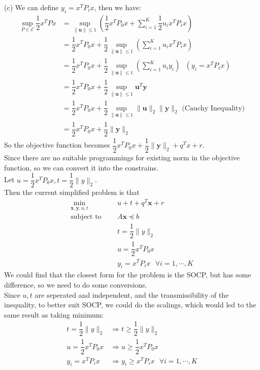 (c) We can define $y_i=x^T P_i x$, then we have:
\begin{align*}
    \sup_{P \in \mathcal{E}}\dfrac{1}{2} x^T P x &= \sup_{\|\mathbf{u}\|\leq 1}\left(\dfrac{1}{2} x^T P_0 x + \sum_{i=1}^{K}\dfrac{1}{2} u_ix^T P_i x\right) \\
    &= \dfrac{1}{2} x^T P_0 x + \dfrac{1}{2}\sup_{\|\mathbf{u}\|\leq 1}\left(\sum_{i=1}^{K} u_ix^T P_i x\right) \\
    &= \dfrac{1}{2} x^T P_0 x + \dfrac{1}{2}\sup_{\|\mathbf{u}\|\leq 1}\left(\sum_{i=1}^{K} u_iy_i \right) \text{\ \ \ \ \ \ \ } (y_i=x^T P_i x)\\
    &= \dfrac{1}{2} x^T P_0 x + \dfrac{1}{2}\sup_{\|\mathbf{u}\|\leq 1}\mathbf{u}^T\mathbf{y} \\
    &= \dfrac{1}{2} x^T P_0 x + \dfrac{1}{2}\sup_{\|\mathbf{u}\|\leq 1}\|\mathbf{u}\|_2\|\mathbf{y}\|_2 \text{\ \ \ \ \ \ \ \ \ (Cauchy Inequality)} \\
    &= \dfrac{1}{2} x^T P_0 x + \dfrac{1}{2}\|\mathbf{y}\|_2
\end{align*}
So the objective function becomes $\dfrac{1}{2} x^T P_0 x + \dfrac{1}{2}\|\mathbf{y}\|_2 + q^T x+r$.\\
Since there are no suitable programmings for existing norm in the objective function, so we can convert it into the constrains.\\
Let $u=\dfrac{1}{2}x^TP_0x, t=\dfrac{1}{2}\|y\|_2$.\\
Then the current simplified problem is that
\begin{align*}
    \min_{\mathbf{x},\mathbf{y},u,t}\ \ \ \ \ & u+t+q^T \mathbf{x}+r \\
    \text {subject to }\ \ \ \ \ & A \mathbf{x} \preceq b \\
    & t = \dfrac{1}{2}\|y\|_2 \\
    & u = \dfrac{1}{2}x^TP_0x \\
    & y_i = x^TP_ix \ \ \ \forall i=1,\cdots,K
\end{align*}
We could find that the closest form for the problem is the SOCP, but has some difference, so we need to do some conversions.\\
Since $u,t$ are seperated and independent, and the transmissibility of the inequality, to better suit SOCP, we could do the scalings, which would led to the same result as taking minimum:
\begin{align*}
    t = \dfrac{1}{2}\|y\|_2 &\Rightarrow t \geq \dfrac{1}{2}\|y\|_2\\
    u = \dfrac{1}{2}x^TP_0x &\Rightarrow u \geq \dfrac{1}{2}x^TP_0x\\
    y_i = x^TP_ix &\Rightarrow y_i \geq x^TP_ix \ \ \ \forall i=1,\cdots,K
\end{align*} 
